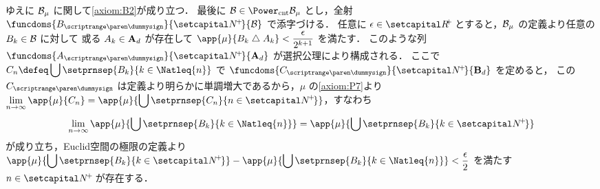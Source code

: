 \documentclass[a4paper,dvipdfmx,leqno]{jsarticle}
\begin{document}
{      ゆえに \(\mathcal{B}_{\mu}\) に関して\eqref{axiom:B2}が成り立つ．
    \decosep
      最後に \(\famB \in \Powercnt{\famB_{\mu}}\) とし，全射 \(\funcdoms{B_{\dummysub}}{\setNpos}{\famB}\) で添字づける．
      任意に \(\epsilon \in \setRpos\) とすると，\(\mathcal{B}_{\mu}\) の定義より任意の \(B_{k} \in \mathcal{B}\) に対して
      或る \(A_{k} \in \mathbf{A}_{d}\) が存在して \(\displaystyle \app{\mu}{B_{k} \symdiff A_{k}} < \frac{\epsilon}{2^{k + 1}}\) を満たす．
      このような列 \(\funcdoms{A_{\dummysub}}{\setNpos}{\famAR{d}}\) が選択公理により構成される．
      ここで \(\displaystyle C_{n} \defeq \bigcup \setprnsep{B_{k}}{k \in \Natleq{n}}\) で
      \(\funcdoms{C_{\dummysub}}{\setNpos}{\famBorel{d}}\) を定めると，
      この \(C_{\dummysub}\) は定義より明らかに単調増大であるから，\(\mu\) の\eqref{axiom:P7}より
      \(\displaystyle \lim_{n \to \infty} \app{\mu}{C_{n}} = \app{\mu}{\bigcup \setprnsep{C_{n}}{n \in \setNpos}}\)，すなわち
      \begin{align*}
        \lim_{n \to \infty} \app{\mu}{\bigcup \setprnsep{B_{k}}{k \in \Natleq{n}}}
          = \app{\mu}{\bigcup \setprnsep{B_{k}}{k \in \setNpos}}
      \end{align*}
      が成り立ち，Euclid空間の極限の定義より
      \(\displaystyle \app{\mu}{\bigcup \setprnsep{B_{k}}{k \in \setNpos}}
        - \app{\mu}{\bigcup \setprnsep{B_{k}}{k \in \Natleq{n}}} < \frac{\epsilon}{2}\)
      を満たす \(n \in \setNpos\) が存在する．
    }
\end{document}
